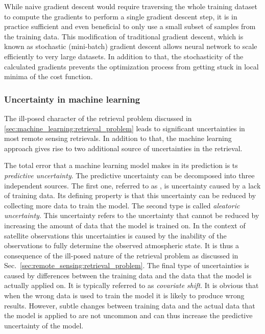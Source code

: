 \begin{description}
While naive gradient descent would require traversing the whole training dataset
to compute the gradients to perform a single gradient descent step, it is in
practice sufficient and even beneficial to only use a small subset of samples
from the training data. This modification of traditional gradient descent, which
is known as stochastic (mini-batch) gradient descent allows neural network to
scale efficiently to very large datasets. In addition to that, the stochasticity
of the calculated gradients prevents the optimization process from getting stuck
in local minima of the cost function.

\subsubsection{Uncertainty in machine learning}

The ill-posed character of the retrieval problem discussed in
\ref{sec:machine_learning:retrieval_problem} leads to significant
uncertainties in most remote sensing retrievals. In addition to that,
the machine learning approach gives rise to two additional source
of uncertainties in the retrieval.


The total error that a machine learning model makes in its prediction is ts
\textit{predictive uncertainty}. The predictive uncertainty can be decomposed
into three independent sources. The first one, referred to as , is uncertainty caused by a lack of training data. Its defining
property is that this uncertainty can be reduced by collecting more data to
train the model. The second type is called \textit{aleatoric uncertainty}. This
uncertainty refers to the uncertainty that cannot be reduced by increasing the
amount of data that the model is trained on. In the context of satellite
observations this uncertainties is caused by the inability of the observations
to fully determine the observed atmospheric state. It is thus a consequence of
the ill-posed nature of the retrieval problem as discussed in
Sec.~\ref{sec:remote_sensing:retrieval_problem}.
The final type of uncertainties is caused by differences between the training
data and the data that the model is actually applied on. It is typically
referred to as \textit{covariate shift}. It is obvious that when the wrong data
is used to train the model it is likely to produce wrong results. However,
subtle changes between training data and the actual data that the model is
applied to are not uncommon and can thus increase the predictive uncertainty of
the model.


\end{description}
